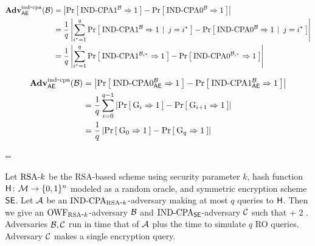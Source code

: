 \begin{align*}
  \mathbf{Adv}^{\mathrm{ind\mbox{-} cpa}}_{\textsf{AE}}({\mathcal B})
    &= \left| \Pr\left[\: \textnormal{IND-CPA}1^{\mathcal B}\Rightarrow1 \:\right] - \Pr\left[\: \textnormal{IND-CPA}0^{\mathcal B}\Rightarrow1 \:\right] \right|\\
    &= \frac{1}{q} \left|
    \sum_{i^*=1}^q{\Pr}\left[\: \textnormal{IND-CPA}1^{\mathcal B}\Rightarrow1\:\left|\right.\:j= i^*\:\right] -
    {\Pr}\left[\: \textnormal{IND-CPA}0^{\mathcal B}\Rightarrow1\:\left|\right.\:j=i^*\:\right] \right|\\
    &= \frac{1}{q} \left|
    \sum_{i^*=1}^q\Pr\left[\: \textnormal{IND-CPA}1^{{\mathcal B}_{i^*}}\Rightarrow1 \:\right] - \Pr\left[\: \textnormal{IND-CPA}0^{{\mathcal B}_{i^*}}\Rightarrow1 \:\right] \right|
\end{align*}
  

\begin{align*}
\mathbf{Adv}^{\mathrm{ind\mbox{-} cpa}}_{\textsf{AE}}({\mathcal B}) 
  &= \left|\Pr\left[\: \textnormal{IND-CPA}0_{\textsf{AE}}^{\mathcal B}\Rightarrow1 \:\right] -
                      \Pr\left[\: \textnormal{IND-CPA}1_{\textsf{AE}}^{\mathcal B}\Rightarrow1 \:\right]\right|\\
  &= \frac{1}{q}\sum_{i=0}^{q-1} \left|\Pr\left[\: {{\textnormal G}}_i\Rightarrow1 \:\right] - \Pr\left[\: {{\textnormal G}}_{i+1}\Rightarrow1 \:\right]\right|\\
  &= \frac{1}{q}\left|\Pr\left[\: {{\textnormal G}}_0\Rightarrow1 \:\right] - \Pr\left[\: {{\textnormal G}}_q\Rightarrow1 \:\right]\right|
\end{align*}



\bnm
  \AdvOWFRSA{\RSAk}{\advA} = \Prob{\OWF_{\RSAk}^\advA\Rightarrow\true}
\enm


\begin{theorem*}
Let $\textnormal{RSA}\mbox{-} k$ be the RSA-based scheme using
security parameter $k$, hash function
$\mathsf{H}{{\kern .05em}\colon{\kern .05em}}{\cal M}\rightarrow\{0,1\}^n$ modeled as a random oracle, and
symmetric encryption scheme $\textnormal{\textsf{SE}}$. Let ${\mathcal A}$ be
an $\textnormal{IND-CPA}_{\textnormal{RSA}\mbox{-} k}$-adversary making at most $q$ queries to
$\mathsf{H}$. Then we give an
$\textnormal{OWF}_{\textnormal{RSA}\mbox{-} k}$-adversary ${\mathcal B}$ and $\textnormal{IND-CPA}_{\textnormal{\textsf{SE}}}$-adversary
${\mathcal C}$ such that
\bnm
  \AdvINDCPA{\RSAk,\Horacle}{\advA} \cdotsm\AdvOWF{\RSAk}{\advB} +  
        2\cdotsm\AdvROR{\SEscheme}{\advC}  \;.
\enm
Adversaries ${\mathcal B},{\mathcal C}$ run in time that of ${\mathcal A}$ plus 
the time to simulate $q$ RO queries. Adversary ${\mathcal C}$ makes a single encryption query.
\end{theorem*}



